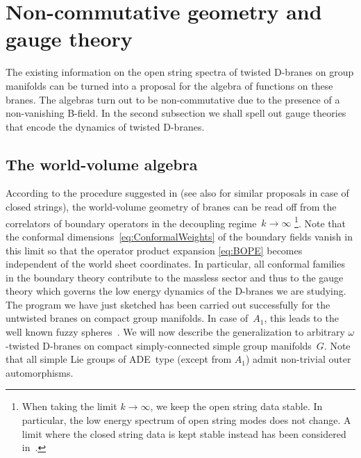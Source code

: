 \documentclass[12pt,a4paper]{article}
\begin{document}
\section{Non-commutative geometry and gauge theory}

The existing information on the open string spectra of twisted 
D-branes on group manifolds can be turned into a proposal for 
the algebra of functions on these branes. The algebras turn out 
to be non-commutative due to the presence of a non-vanishing B-field. 
In the second subsection we shall spell out gauge theories that 
encode the dynamics of twisted D-branes.     

\subsection{The world-volume algebra}

According to the procedure suggested in \cite{Schomerus:1999ug,
Alekseev:1999bs} (see also \cite{Frohlich:1993es,
Frohlich:1995mr} 
for similar proposals in case of closed strings), the world-volume 
geometry of branes can be read off from the correlators of boundary 
operators in the decoupling regime~$k \rightarrow \infty$
\footnote{When taking the limit $k\to \infty $, we keep the open string
data stable. In particular, the low energy spectrum of open string modes
does not change. A limit where the closed string data is kept stable
instead has been considered in~\cite{Felder:1999ka}.}. Note that 
the conformal dimensions~\eqref{eq:ConformalWeights} of the boundary 
fields vanish in this limit so that the operator product expansion
\eqref{eq:BOPE} becomes independent of the world sheet coordinates.
In particular, all conformal families in the boundary theory contribute 
to the massless sector and thus to the gauge theory which governs the 
low energy dynamics of the D-branes we are studying. The program we 
have just sketched has been carried out successfully for the 
untwisted branes on compact group manifolds. In case of~$A_1$, 
this leads to the well known fuzzy spheres~\cite{Madore:1992bw, 
Alekseev:1999bs}. We will now describe the generalization to 
arbitrary $\omega$-twisted D-branes on compact simply-connected
simple group manifolds~$G$. Note that all simple Lie groups of 
ADE~type (except from $A_1$) admit non-trivial outer automorphisms.
\end{document}
